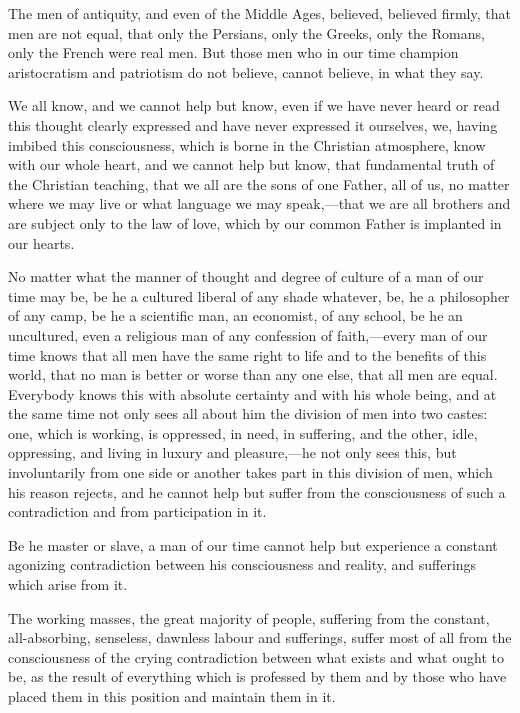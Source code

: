 \documentclass{book}
\begin{document}
The men of antiquity, and even of the Middle Ages, believed, believed firmly, that men are not equal, that only the Persians, only the Greeks, only the Romans, only the French were real men. But those men who in our time champion aristocratism and patriotism do not believe, cannot believe, in what they say.

We all know, and we cannot help but know, even if we have never heard or read this thought clearly expressed and have never expressed it ourselves, we, having imbibed this consciousness, which is borne in the Christian atmosphere, know with our whole heart, and we cannot help but know, that fundamental truth of the Christian teaching, that we all are the sons of one Father, all of us, no matter where we may live or what language we may speak,—that we are all brothers and are subject only to the law of love, which by our common Father is implanted in our hearts.

No matter what the manner of thought and degree of culture of a man of our time may be, be he a cultured liberal of any shade whatever, be, he a philosopher of any camp, be he a scientific man, an economist, of any school, be he an uncultured, even a religious man of any confession of faith,—every man of our time knows that all men have the same right to life and to the benefits of this world, that no man is better or worse than any one else, that all men are equal. Everybody knows this with absolute certainty and with his whole being, and at the same time not only sees all about him the division of men into two castes: one, which is working, is oppressed, in need, in suffering, and the other, idle, oppressing, and living in luxury and pleasure,—he not only sees this, but involuntarily from one side or another takes part in this division of men, which his reason rejects, and he cannot help but suffer from the consciousness of such a contradiction and from participation in it.

Be he master or slave, a man of our time cannot help but experience a constant agonizing contradiction between his consciousness and reality, and sufferings which arise from it.

The working masses, the great majority of people, suffering from the constant, all-absorbing, senseless, dawnless labour and sufferings, suffer most of all from the consciousness of the crying contradiction between what exists and what ought to be, as the result of everything which is professed by them and by those who have placed them in this position and maintain them in it.
\end{document}
